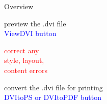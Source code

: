 \documentclass{beamer}
\newcommand{\bc}{\begin{center}}
\newcommand{\ec}{\end{center}}
\begin{document}
\begin{frame}{Overview}
\begin{center}
\end{center}
\vspace{-0.7cm}
\bc
preview the .dvi file\\
\textcolor{blue}{ViewDVI button}
\ec
\vspace{-3.8cm}
\begin{flushleft}
\hspace*{1.2cm}
\end{flushleft}
\begin{flushleft}
\parbox{3cm}{\bc\textcolor{red}{correct any\\ style, layout,\\content 
errors}\ec}
\end{flushleft}
\begin{flushleft}
\hspace*{1.2cm}
\end{flushleft}
\vspace{-1cm}
\begin{center}
\end{center}
\vspace{-0.7cm}
\bc
convert the .dvi file for printing\\
\textcolor{blue}{DVItoPS or DVItoPDF button}
\ec
\begin{center}

\end{center}
\end{frame}
\end{document}
